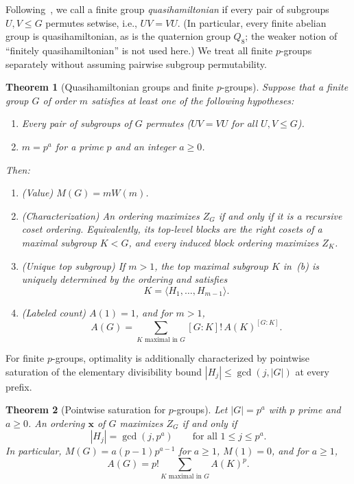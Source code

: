 \documentclass[11pt,reqno]{amsart}
\numberwithin{equation}{section}
\newtheorem{theorem}{Theorem}[section]
\theoremstyle{definition}
\theoremstyle{remark}
\begin{document}
Following~\cite{BS20}, we call a finite group \emph{quasihamiltonian} if every pair of subgroups $U,V\le G$ permutes setwise, i.e., $UV=VU$. (In particular, every finite abelian group is quasihamiltonian, as is the quaternion group $Q_8$; the weaker notion of ``finitely quasihamiltonian'' is not used here.) We treat all finite $p$-groups separately without assuming pairwise subgroup permutability.

\begin{theorem}[Quasihamiltonian groups and finite $p$-groups]
\label{thm:main}
Suppose that a finite group $G$ of order $m$ satisfies at least one of the following hypotheses:
\begin{enumerate}[label=(\arabic*),leftmargin=2em]
\item Every pair of subgroups of $G$ permutes ($UV=VU$ for all $U,V\le G$).
\item $m=p^a$ for a prime $p$ and an integer $a\ge 0$.
\end{enumerate}
Then:
\begin{enumerate}[label=(\alph*),leftmargin=2em]
\item \emph{(Value)} $M(G)=mW(m)$.
\item \emph{(Characterization)} An ordering maximizes $Z_G$ if and only if it is a recursive coset ordering. Equivalently, its top-level blocks are the right cosets of a maximal subgroup $K<G$, and every induced block ordering maximizes $Z_K$.
\item \emph{(Unique top subgroup)} If $m>1$, the top maximal subgroup $K$ in~\textup{(b)} is uniquely determined by the ordering and satisfies
\begin{equation}
\label{eq:unique-top}
K = \langle H_1,\ldots,H_{m-1}\rangle.
\end{equation}
\item \emph{(Labeled count)} $A(1)=1$, and for $m>1$,
\begin{equation}
\label{eq:count-rec}
A(G) = \sum_{K\text{ maximal in }G} [G:K]!\, A(K)^{[G:K]}.
\end{equation}
\end{enumerate}
\end{theorem}

For finite $p$-groups, optimality is additionally characterized by pointwise saturation of the elementary divisibility bound $|H_j|\le \gcd(j,|G|)$ at every prefix.

\begin{theorem}[Pointwise saturation for $p$-groups]
\label{thm:pgroup}
Let $|G|=p^a$ with $p$ prime and $a\ge 0$. An ordering $\mathbf{x}$ of $G$ maximizes $Z_G$ if and only if
\begin{equation}
\label{eq:saturation}
|H_j| = \gcd(j,p^a) \qquad \text{for all } 1\le j\le p^a.
\end{equation}
In particular, $M(G)=a(p-1)p^{a-1}$ for $a\ge 1$, $M(1)=0$, and for $a\ge 1$,
\begin{equation}
\label{eq:pgroup-count}
A(G) = p! \sum_{K\text{ maximal in }G} A(K)^p.
\end{equation}
\end{theorem}
\end{document}

